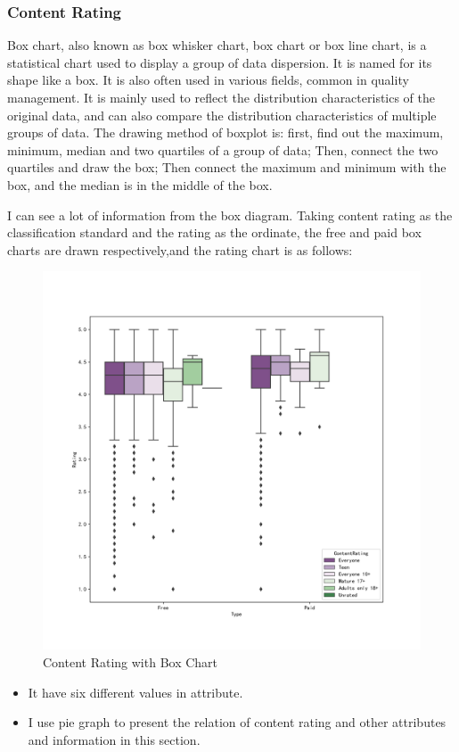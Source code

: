 \documentclass{hci}
\begin{document}
\subsubsection{Content Rating}
Box chart, also known as box whisker chart, box chart or box line chart, is a statistical chart used to display a group of data dispersion. It is named for its shape like a box. It is also often used in various fields, common in quality management. It is mainly used to reflect the distribution characteristics of the original data, and can also compare the distribution characteristics of multiple groups of data. The drawing method of boxplot is: first, find out the maximum, minimum, median and two quartiles of a group of data; Then, connect the two quartiles and draw the box; Then connect the maximum and minimum with the box, and the median is in the middle of the box.

I can see a lot of information from the box diagram. Taking content rating as the classification standard and the rating as the ordinate, the free and paid box charts are drawn respectively,and the rating chart is as follows:
\begin{figure}[htbp]
	\centering
	\includegraphics[width=0.7\linewidth]{figures/box}
	\caption{Content Rating with Box Chart}
	\label{fig:contentrating}
\end{figure}
\begin{itemize}
	\item It have six different values in attribute.
	\item I use pie graph to present the relation of content rating and other attributes and information in
	this section.
\end{itemize}
\end{document}
